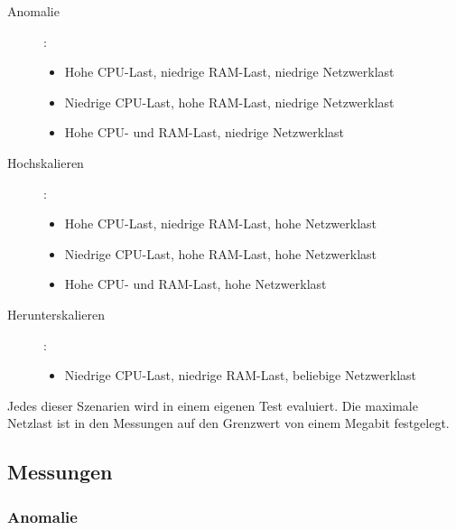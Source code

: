\documentclass[a4paper,10pt]{scrartcl}
\begin{document}
\begin{description}
\item[Anomalie]:
\begin{itemize}
\item Hohe CPU-Last, niedrige RAM-Last, niedrige Netzwerklast
\item Niedrige CPU-Last, hohe RAM-Last, niedrige Netzwerklast
\item Hohe CPU- und RAM-Last, niedrige Netzwerklast
\end{itemize}
\item[Hochskalieren]:
\begin{itemize}
\item Hohe CPU-Last, niedrige RAM-Last, hohe Netzwerklast
\item Niedrige CPU-Last, hohe RAM-Last, hohe Netzwerklast
\item Hohe CPU- und RAM-Last, hohe Netzwerklast
\end{itemize}
\item[Herunterskalieren]:
\begin{itemize}
\item Niedrige CPU-Last, niedrige RAM-Last, beliebige Netzwerklast
\end{itemize}
\end{description}

Jedes dieser Szenarien wird in einem eigenen Test evaluiert.
Die maximale Netzlast ist in den Messungen auf den Grenzwert von einem Megabit festgelegt.

\pagebreak
\subsection{Messungen}

\subsubsection{Anomalie}
\end{document}
